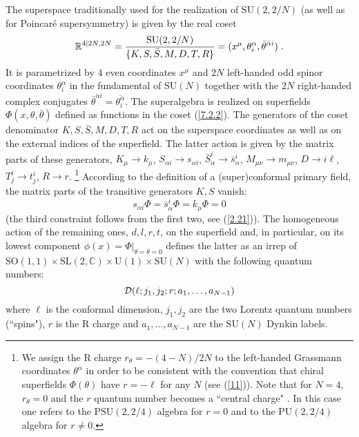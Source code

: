 \documentclass[a4paper,12pt]{article}
\begin{document}
The superspace traditionally used for the realization of 
$\mbox{SU}(2,2/N)$ (as well as for Poincar\'{e} supersymmetry) is 
given by the real coset 
\begin{equation}
{\mathbb R}^{4\vert 2N,2N} = {\mbox{SU}(2,2/N)\over \{K,S,\bar 
S,M,D,T,R\}} = (x^\mu,\theta^{\alpha}_i, \bar\theta^{\dot\alpha 
i})\;. \label{7.2.2} 
\end{equation}
It is parametrized by 4 even coordinates $x^\mu$ and $2N$ 
left-handed odd spinor coordinates $\theta^{\alpha}_i$ in the 
fundamental of $\mbox{SU}(N)$ together with the $2N$ right-handed 
complex conjugates $\bar\theta^{\dot\alpha i} = 
\overline{\theta^{\alpha}_i}$. The superalgebra is realized on 
superfields $\Phi(x,\theta,\bar\theta)$ defined as functions in 
the coset (\ref{7.2.2}). The generators of the coset denominator 
$K,S,\bar S,M,D,T,R$ act on the superspace coordinates as well as 
on the external indices of the superfield. The latter action is 
given by the matrix parts of these generators, $K_\mu\rightarrow 
k_\mu$, $S_{\alpha i}\rightarrow s_{\alpha i}$, $\bar 
S_{\dot\alpha}^i\rightarrow \bar s_{\dot\alpha}^i$, 
$M_{\mu\nu}\rightarrow  m_{\mu\nu}$, $D\rightarrow i\ell$, 
$T^i_j\rightarrow t^i_j$, $R\rightarrow r$. \footnote{We assign 
the R charge $r_\theta=-{(4-N)/2N}$ to the left-handed Grassmann 
coordinates $\theta^\alpha$ in order to be consistent with the 
convention that chiral superfields $\Phi(\theta)$ have $r=-\ell$ 
for any $N$ (see (\ref{11})). Note that for $N=4$, $r_\theta =0$ 
and the $r$ quantum number becomes a ``central charge" 
\cite{dp,bin}. In this case one refers to the $\mbox{PSU}(2,2/4)$ 
algebra for $r=0$ and to the $\mbox{PU}(2,2/4)$ algebra for 
$r\neq 0$.} According to the definition of a (super)conformal 
primary field, the matrix parts of the transitive generators 
$K,S$ vanish: 
\begin{equation}\label{6}
  s_{\alpha i}\Phi= \bar s_{\dot\alpha}^i\Phi=  k_\mu\Phi= 0
\end{equation}
(the third constraint follows from the first two, see 
(\ref{2.21})). The homogeneous action of the remaining ones, 
$d,l,r,t$, on the superfield and, in particular, on its lowest 
component $\phi(x)=\Phi\vert_{\theta=\bar\theta=0}$ defines the 
latter as an irrep of $\mbox{SO}(1,1)\times \mbox{SL}(2,{\mathbb 
C})\times \mbox{U}(1)\times \mbox{SU}(N)$ with the following 
quantum numbers: 
\begin{equation}\label{7}
  {\cal D}(\ell;j_1,j_2;r;a_1,\ldots, a_{N-1})
\end{equation}
where $\ell$ is the conformal dimension, $j_1,j_2$ are the two 
Lorentz quantum numbers (``spins"), $r$ is the R charge and 
$a_1,\ldots, a_{N-1}$ are the $\mbox{SU}(N)$ Dynkin labels.  
  
\end{document}
